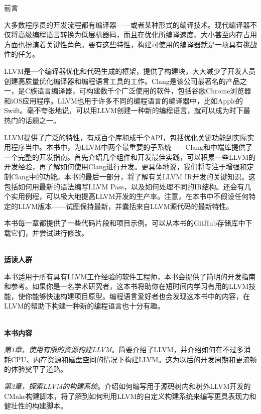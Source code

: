 \begin{flushright}
	 前言
\end{flushright}

大多数程序员的开发流程都有编译器——或者某种形式的编译技术。现代编译器不仅将高级编程语言转换为低层机器码，而且在优化所编译速度、大小甚至内存占用方面也扮演着关键性角色。要有这些特性，构建可使用的编译器就是一项具有挑战性的任务。

LLVM是一个编译器优化和代码生成的框架，提供了构建块，大大减少了开发人员创建高质量优化编译器和编程语言工具的工作。Clang是该公司最著名的产品之一，是C族语言编译器，可构建数千个广泛使用的软件，包括谷歌Chrome浏览器和iOS应用程序。LLVM也用于许多不同的编程语言的编译器中，比如Apple的Swift。毫不夸张地说，可以用LLVM创建一种新的编程语言，就可以成为时下最热门的话题之一。

LLVM提供了广泛的特性，有成百个库和成千个API，包括优化关键功能到实际实用程序当中。本书中，为LLVM中两个最重要的子系统——Clang和中端库提供了一个完整的开发指南。首先介绍几个组件和开发最佳实践，可以积累一些LLVM的开发经验，再了解如何使用Clang进行开发。更具体地说，我们将专注于增强和定制Clang中的功能。本书的最后一部分，将了解有关LLVM IR开发的关键知识。这包括如何用最新的语法编写LLVM Pass，以及如何处理不同的IR结构。还会有几个实用例程，可以极大地提高LLVM开发的生产率。注意，在本书中不假设任何特定的LLVM版本——试图保持最新，并囊括来自LLVM源代码的最新特性。

本书每一章都提供了一些代码片段和项目示例。可以从本书的GitHub存储库中下载它们，并尝试进行修改。

\hspace*{\fill} \\ %
\noindent\textbf{适读人群}

本书适用于所有具有LLVM工作经验的软件工程师，本书会提供了简明的开发指南和参考。如果你是一名学术研究者，这本书将助你在短时间内学习有用的LLVM技能，使你能够快速构建项目原型。编程语言爱好者也会发现这本书中的内容，在LLVM的帮助下构建一种新的编程语言也十分有趣。


\hspace*{\fill} \\ %
\textbf{本书内容}

\textit{第1章，使用有限的资源构建LLVM}。简要介绍了LLVM，并介绍如何在不过多消耗CPU、内存资源和磁盘空间的情况下构建LLVM。这为以后的开发周期和更流畅的体验奠平了道路。

\textit{第2章，探索LLVM的构建系统}。介绍如何编写用于源码树内和树外LLVM开发的CMake构建脚本，将了解到如何利用LLVM的自定义构建系统来编写更具表现力和健壮性的构建脚本。

